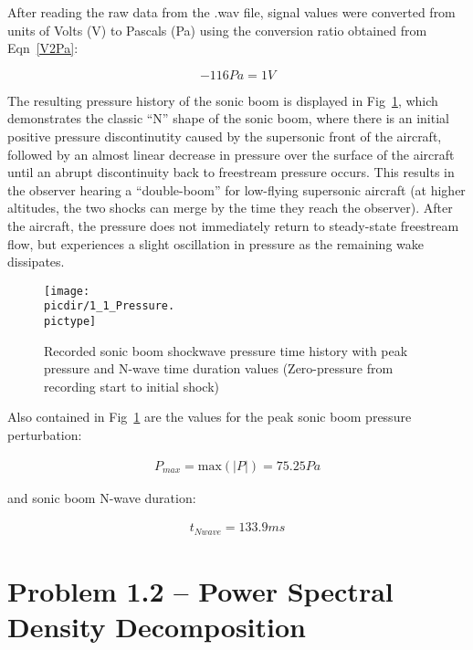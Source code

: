 \documentclass[twocolumn,10pt]{asme2ej}
\begin{document}
After reading the raw data from the .wav file, signal values were converted from units of Volts (V) to Pascals (Pa) using the conversion ratio obtained from Eqn~\ref{V2Pa}:

\begin{equation} \label{V2Pa}
-116Pa = 1V
\end{equation}

The resulting pressure history of the sonic boom is displayed in Fig~\ref{boom}, which demonstrates the classic ``N'' shape of the sonic boom, where there is an initial positive pressure discontinutity caused by the supersonic front of the aircraft, followed by an almost linear decrease in pressure over the surface of the aircraft until an abrupt discontinuity back to freestream pressure occurs.  This results in the observer hearing a ``double-boom'' for low-flying supersonic aircraft (at higher altitudes, the two shocks can merge by the time they reach the observer).  After the aircraft, the pressure does not immediately return to steady-state freestream flow, but experiences a slight oscillation in pressure as the remaining wake dissipates.

\begin{figure}[htb]
\begin{center}
\texttt{[image: \\picdir/1\_1\_Pressure.\\pictype]}
\caption{Recorded sonic boom shockwave pressure time history with peak pressure and N-wave time duration values (Zero-pressure from recording start to initial shock)}
\label{boom}
\end{center}
\end{figure}

Also contained in Fig~\ref{boom} are the values for the peak sonic boom pressure perturbation:

\begin{gather*}
P_{max}=\text{max}\left(|P|\right)=\boxed{75.25Pa}
\end{gather*}

\noindent and sonic boom N-wave duration:

\begin{gather*}
t_{Nwave}=\boxed{133.9ms}
\end{gather*}



\section{Problem 1.2 -- Power Spectral Density Decomposition}
\end{document}
